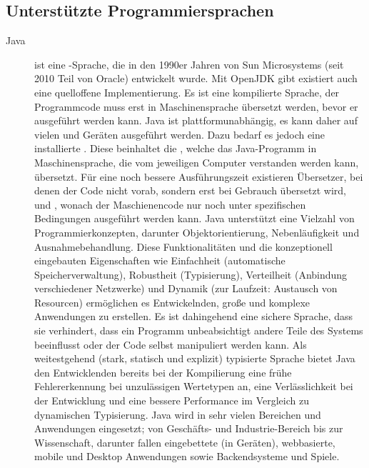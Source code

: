 \subsection{Unterstützte Programmiersprachen}\label{subsec:unterstutzte-programmiersprachen}

\begin{description}
    \item[Java] ist eine -Sprache, die in den 1990er Jahren von Sun Microsystems (seit 2010 Teil von Oracle) entwickelt wurde. Mit OpenJDK gibt existiert auch eine quelloffene Implementierung.
    Es ist eine kompilierte Sprache, \dahe der Programmcode muss erst in Maschinensprache übersetzt werden, bevor er ausgeführt werden kann.
    Java ist plattformunabhängig, es kann daher auf vielen  und Geräten ausgeführt werden.
    Dazu bedarf es jedoch eine installierte .
    Diese beinhaltet \uA die , welche das Java-Programm in Maschinensprache, die vom jeweiligen Computer verstanden werden kann, übersetzt.
    Für eine noch bessere Ausführungszeit existieren  Übersetzer, bei denen der Code nicht vorab, sondern erst bei Gebrauch übersetzt wird, und  , wonach der Maschienencode nur noch unter spezifischen Bedingungen ausgeführt werden kann.
    Java unterstützt eine Vielzahl von Programmierkonzepten, darunter Objektorientierung, Nebenläufigkeit und Ausnahmebehandlung.
    Diese Funktionalitäten und die konzeptionell eingebauten Eigenschaften wie Einfachheit (\zB automatische Speicherverwaltung), Robustheit (\zB Typisierung), Verteilheit (Anbindung verschiedener Netzwerke) und Dynamik (zur Laufzeit: Austausch von Resourcen) ermöglichen es Entwickelnden, große und komplexe Anwendungen zu erstellen.
    Es ist dahingehend eine sichere Sprache, dass sie verhindert, dass ein Programm unbeabsichtigt andere Teile des Systems beeinflusst oder der Code selbst manipuliert werden kann.
    Als weitestgehend (stark, statisch und explizit) typisierte Sprache bietet Java den Entwicklenden bereits bei der Kompilierung eine frühe Fehlererkennung bei unzulässigen Wertetypen an, eine Verlässlichkeit bei der Entwicklung und eine bessere Performance im Vergleich zu dynamischen Typisierung.
    Java wird in sehr vielen Bereichen und Anwendungen eingesetzt;
    von Geschäfts- und Industrie-Bereich bis zur Wissenschaft, darunter fallen eingebettete (in Geräten), webbasierte, mobile und Desktop Anwendungen sowie Backendsysteme und Spiele.


\end{description}
